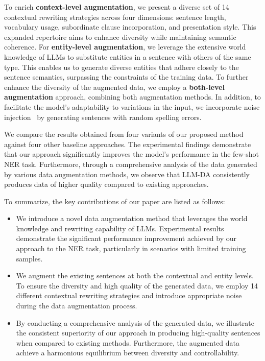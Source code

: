 \documentclass[11pt]{article}
\begin{document}
To enrich \textbf{context-level augmentation}, we present a diverse set of 14 contextual rewriting strategies across four dimensions: sentence length, vocabulary usage, subordinate clause incorporation, and presentation style. This expanded repertoire aims to enhance diversity while maintaining semantic coherence.
For \textbf{entity-level augmentation}, we leverage the extensive world knowledge of LLMs to substitute entities in a sentence with others of the same type. This enables us to generate diverse entities that adhere closely to the sentence semantics, surpassing the constraints of the training data.
To further enhance the diversity of the augmented data, we employ a \textbf{both-level augmentation} approach, combining both augmentation methods.
In addition, to facilitate the model's adaptability to variations in the input,
we incorporate noise injection~\cite{Noise} by generating sentences with random spelling errors.


We compare the results obtained from four variants of our proposed method against four other baseline approaches. The experimental findings demonstrate that our approach
significantly improves the model's performance in the few-shot NER task. 
Furthermore, through a comprehensive analysis of the data generated by various data augmentation methods, we observe that LLM-DA consistently produces data of higher quality compared to existing approaches.

To summarize, the key contributions of our paper are listed as follows:
\begin{itemize}
    \item
    We introduce a novel data augmentation method that leverages the world knowledge and rewriting capability of LLMs. Experimental results demonstrate the significant performance improvement achieved by our approach to the NER task, particularly in scenarios with limited training samples.
    \item 
    We augment the existing sentences at both the contextual and entity levels. To ensure the diversity and high quality of the generated data, we employ 14 different contextual rewriting strategies and introduce appropriate noise during the data augmentation process.
    \item
    By conducting a comprehensive analysis of the generated data, we illustrate the consistent superiority of our approach in producing high-quality sentences when compared to existing methods. Furthermore, the augmented data achieve a harmonious equilibrium between diversity and controllability.
\end{itemize}
\end{document}
